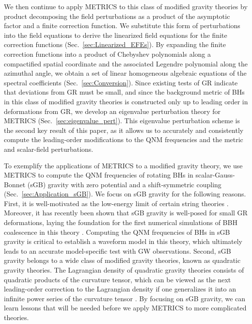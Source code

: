 \documentclass[aps,prx,amsmath,floats,floatfix,twocolumn,
  superscriptaddress,nofootinbib,showpacs]{revtex4-1}
\begin{document}
We then continue to apply METRICS to this class of modified gravity theories by product decomposing the field perturbations as a product of the asymptotic factor and a finite correction function. 
We substitute this form of perturbations into the field equations to derive the linearized field equations for the finite correction functions (Sec.~\ref{sec:Linearized_EFEs}). 
By expanding the finite correction functions into a product of Chebyshev polynomials along a compactified spatial coordinate and the associated Legendre polynomial along the azimuthal angle, we obtain a set of linear homogeneous algebraic equations of the spectral coefficients (Sec.~\ref{sec:Conversion}).
Since existing tests of GR indicate that deviations from GR must be small, and since the background metric of BHs in this class of modified gravity theories is constructed only up to leading order in deformations from GR,  we develop an eigenvalue perturbation theory for METRICS (Sec.~\ref{sec:eigenvalue_pert}). This eigenvalue perturbation scheme is the second key result of this paper, as it allows us to accurately and consistently compute the leading-order modifications to the QNM frequencies and the metric and scalar-field perturbations. 

To exemplify the applications of METRICS to a modified gravity theory, we use METRICS to compute the QNM frequencies of rotating BHs in scalar-Gauss-Bonnet (sGB) gravity with zero potential and a shift-symmetric coupling (Sec.~\ref{sec:Application_sGB}). 
We focus on sGB gravity for the following reasons. 
First, it is well-motivated as the low-energy limit of certain string theories \cite{Maeda:2009uy, Moura:2006pz}. 
Moreover, it has recently been shown that sGB gravity is well-posed \cite{AresteSalo:2022hua, Kovacs:2020pns} for small GR deformations, laying the foundation for the first numerical simulations of BBH coalescence in this theory \cite{East:2020hgw, AresteSalo:2023mmd, AresteSalo:2023hcp}. 
Computing the QNM frequencies of BHs in sGB gravity is critical to establish a waveform model in this theory, which ultimately leads to an accurate model-specific test with GW observations. 
Second, sGB gravity belongs to a wide class of modified gravity theories, known as quadratic gravity theories. 
The Lagrangian density of quadratic gravity theories consists of quadratic products of the curvature tensor, which can be viewed as the next leading-order correction to the Lagrangian density if one generalizes it into an infinite power series of the curvature tensor \cite{Cano_Ruiperez_2019}. 
By focusing on sGB gravity, we can learn lessons that will be needed before we apply METRICS to more complicated theories. 
\end{document}
